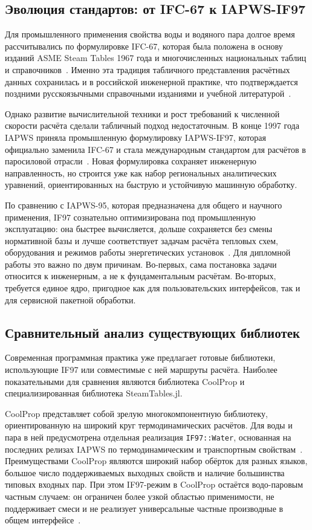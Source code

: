 \subsection{Эволюция стандартов: от IFC-67 к IAPWS-IF97}

Для промышленного применения свойства воды и водяного пара
долгое время рассчитывались по формулировке IFC-67,
которая была положена в основу изданий ASME Steam Tables 1967 года
и многочисленных национальных таблиц и справочников~\cite{iapws_faq_asme}.
Именно эта традиция табличного представления расчётных данных
сохранилась и в российской инженерной практике,
что подтверждается поздними русскоязычными справочными изданиями
и учебной литературой~\cite{alexandrov_grigorev_1999,gidaspov_severina_2014}.

Однако развитие вычислительной техники
и рост требований к численной скорости расчёта
сделали табличный подход недостаточным.
В конце 1997 года IAPWS приняла промышленную формулировку IAPWS-IF97,
которая официально заменила IFC-67
и стала международным стандартом для расчётов в паросиловой отрасли~\cite{iapws_faq_asme}.
Новая формулировка сохраняет инженерную направленность,
но строится уже как набор региональных аналитических уравнений,
ориентированных на быструю и устойчивую машинную обработку.

По сравнению с IAPWS-95,
которая предназначена для общего и научного применения,
IF97 сознательно оптимизирована под промышленную эксплуатацию:
она быстрее вычисляется,
дольше сохраняется без смены нормативной базы
и лучше соответствует задачам расчёта тепловых схем,
оборудования и режимов работы энергетических установок~\cite{iapws_faq_asme,coolprop_if97_docs}.
Для дипломной работы это важно по двум причинам.
Во-первых, сама постановка задачи относится к инженерным, а не к фундаментальным расчётам.
Во-вторых, требуется единое ядро,
пригодное как для пользовательских интерфейсов,
так и для сервисной пакетной обработки.

\subsection{Сравнительный анализ существующих библиотек}

Современная программная практика уже предлагает готовые библиотеки,
использующие IF97 или совместимые с ней маршруты расчёта.
Наиболее показательными для сравнения являются библиотека CoolProp
и специализированная библиотека SteamTables.jl.

CoolProp представляет собой зрелую многокомпонентную библиотеку,
ориентированную на широкий круг термодинамических расчётов.
Для воды и пара в ней предусмотрена отдельная реализация \texttt{IF97::Water},
основанная на последних релизах IAPWS по термодинамическим и транспортным свойствам~\cite{coolprop_if97_docs}.
Преимуществами CoolProp являются
широкий набор обёрток для разных языков,
большое число поддерживаемых выходных свойств
и наличие большинства типовых входных пар.
При этом IF97-режим в CoolProp остаётся водо-паровым частным случаем:
он ограничен более узкой областью применимости,
не поддерживает смеси
и не реализует универсальные частные производные в общем интерфейсе~\cite{coolprop_if97_docs}.


